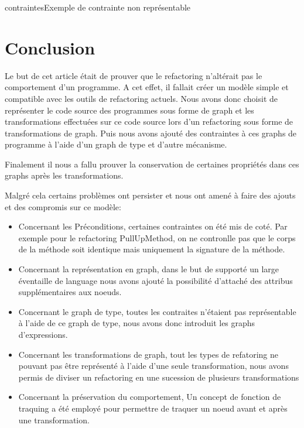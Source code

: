 \documentclass[a4paper, 12pt]{article}
\begin{document}
\begin{figu}{contraintes}{Exemple de contrainte non représentable}
{  \section{Conclusion}

  Le but de cet article était de prouver que le refactoring n'altérait pas le comportement d'un programme.
  A cet effet, il fallait créer un modèle simple et compatible avec les outils de refactoring actuels. Nous avons donc choisit de représenter le code source des programmes sous forme de graph
  et les transformations effectuées sur ce code source lors d'un refactoring sous forme de transformations de graph. Puis nous avons ajouté des contraintes à ces graphs de programme à l'aide d'un graph de type et d'autre mécanisme.

  Finalement il nous a fallu prouver la conservation de certaines propriétés dans ces graphs après les transformations.

  Malgré cela certains problèmes ont persister et nous ont amené à faire des ajouts et des compromis sur ce modèle:

  \begin{itemize}[label=\textbullet]
    \item Concernant les Préconditions, certaines contraintes on été mis de coté. Par exemple pour le refactoring PullUpMethod, on ne contronlle pas que le corps de la méthode soit identique mais uniquement la signature de la méthode.

    \item Concernant la représentation en graph, dans le but de supporté un large éventaille de language nous avons ajouté la possibilité d'attaché des attribus supplémentaires aux noeuds.

    \item Concernant le graph de type, toutes les contraites n'étaient pas représentable à l'aide de ce graph de type, nous avons donc introduit les graphs d'expressions.

    \item Concernant les transformations de graph, tout les types de refatoring ne pouvant pas être représenté à l'aide d'une seule transformation, nous avons permis de diviser un refactoring en une sucession de plusieurs transformations

    \item Concernant la préservation du comportement, Un concept de fonction de traquing a été employé pour permettre de traquer un noeud avant et après une transformation.
  \end{itemize}

}
\end{figu}
\end{document}
